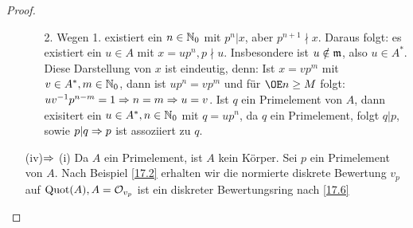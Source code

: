 \begin{proof}
\begin{enumerate}
\begin{enumerate}
			\item[2.] Wegen 1. existiert ein $n \in \mathbb{N}_0 $ mit $ p^n | x$, aber $p^{n+1} \nmid x$. Daraus folgt: es existiert ein $u \in A $ mit $ x = up^n, p \nmid u$. Insbesondere ist $u \notin \mathfrak{m} $, also $u \in A^{*}$. Diese Darstellung von $x$ ist eindeutig, denn: Ist $x = vp^m$ mit $v \in A^{*}, m \in \mathbb{N}_0$, dann ist $up^n=vp^m$ und für $\OE n \geq M $ folgt: $uv^{-1}p^{n-m} =1 \Rightarrow n =m \Rightarrow u =v$. Ist $q$ ein Primelement von $A$, dann exisitert ein $u \in A^{*}, n\in \mathbb{N}_0$ mit $q =up^n$, da $q$ ein Primelement, folgt $q|p$, sowie $p|q \Rightarrow p$ ist assoziiert zu $q$.
		\end{enumerate}
		\item[](iv)$\Rightarrow$ (i) Da $A$ ein Primelement, ist $A$ kein Körper. Sei $p$ ein Primelement von $A$. Nach Beispiel \ref{17.2} erhalten wir die normierte diskrete Bewertung $v_p$ auf $\operatorname{Quot}(A), A = \mathcal{O}_{v_p} $ ist ein diskreter Bewertungsring nach \ref{17.6}
	\end{enumerate}
\end{proof}

